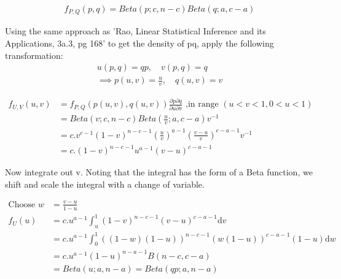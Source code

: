 \documentclass[12pt]{article}
\begin{document}
\begin{align}
 f_{P,Q}(p,q) = Beta(p;c,n-c) Beta(q;a,c-a)
\end{align}

Using the same approach as 'Rao, Linear Statistical Inference and its Applications, 3a.3, pg 168' to get the density of pq, apply the following transformation:
\begin{align}
 u(p,q) = qp, \quad v(p,q) = q  \\
 \implies p(u,v) = \frac{u}{v}, \quad q(u,v) = v
\end{align}

\begin{align}
 f_{U,V}(u,v) &= f_{P,Q}(p(u,v),q(u,v)) 
		\frac{\partial p \partial q}{\partial u \partial v} 
		\text{ ,in range }  (u<v<1,0<u<1) \\
 &= Beta(v;c,n-c) Beta(\frac{u}{v};a,c-a) v^{-1} \\
 &= c . v^{c-1} (1-v)^{n-c-1} (\frac{u}{v})^{a-1} (\frac{v - u}{v})^{c-a-1} v^{-1} \\
 &= c . (1-v)^{n-c-1} u^{a-1} (v - u)^{c-a-1}
\end{align}

Now integrate out v. Noting that the integral has the form of a Beta function, we shift and scale the integral with a change of variable.

\begin{align}
\text{Choose }  w &= \frac{v-u}{1-u} \\
f_U(u) &= c.u^{a-1} \int_u^1 (1-v)^{n-c-1} (v - u)^{c-a-1} \mathrm{d}v \\
 &= c.u^{a-1} \int_0^1 ((1-w)(1-u))^{n-c-1} (w(1-u))^{c-a-1} (1-u) \mathrm{d}w \\
 &= c.u^{a-1} (1-u)^{n-a-1} B(n-c,c-a) \\
 &= Beta(u;a,n-a) = Beta(qp;a,n-a) 
\end{align}
\end{document}
